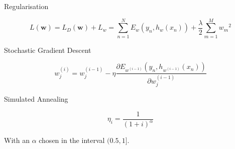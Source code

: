 \begin{frame}{Regularisation}

\[ L(\mathbf{w})
  = L_D(\mathbf{w}) + L_w 
  = \sum_{n=1}^N E_w(y_n, h_w(x_n)) + \frac{\lambda}{2} \sum_{m=1}^{M} {w_m}^2 \] 

\end{frame}

\begin{frame}{Stochastic Gradient Descent}

\[ w_j^{(i)} = w_j^{(i-1)} - \eta \frac{\partial E_{w^{(i-1)}}(y_n, h_{w^{(i-1)}}(x_n))}{\partial w_j^{(i-1)}} \]

\end{frame}


\begin{frame}{Simulated Annealing}

$$\eta_i = \frac{1}{(1+i)^\alpha}$$


With an $\alpha$ chosen in the interval $(0.5,1]$. 

\end{frame}


